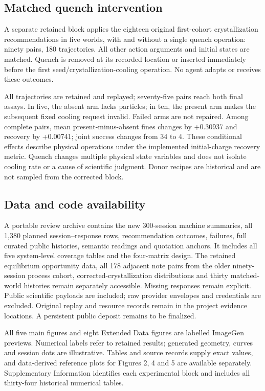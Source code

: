 \documentclass[12pt,a4paper]{article}
\begin{document}
\subsection{Matched quench intervention}\label{matched-quench-intervention}

A separate retained block applies the eighteen original first-cohort crystallization recommendations in five worlds, with and without a single quench operation: ninety pairs, 180 trajectories. All other action arguments and initial states are matched. Quench is removed at its recorded location or inserted immediately before the first seed/crystallization-cooling operation. No agent adapts or receives these outcomes.

All trajectories are retained and replayed; seventy-five pairs reach both final assays. In five, the absent arm lacks particles; in ten, the present arm makes the subsequent fixed cooling request invalid. Failed arms are not repaired. Among complete pairs, mean present-minus-absent fines changes by +0.30937 and recovery by +0.00741; joint success changes from 34 to 4. These conditional effects describe physical operations under the implemented initial-charge recovery metric. Quench changes multiple physical state variables and does not isolate cooling rate or a cause of scientific judgment. Donor recipes are historical and are not sampled from the corrected block.

\subsection{Data and code availability}\label{data-and-code-availability}

A portable review archive contains the new 300-session machine summaries, all 1,380 planned session--response rows, recommendation outcomes, failures, full curated public histories, semantic readings and quotation anchors. It includes all five system-level coverage tables and the four-matrix design. The retained equilibrium opportunity data, all 178 adjacent note pairs from the older ninety-session process cohort, corrected-crystallization distributions and thirty matched-world histories remain separately accessible. Missing responses remain explicit. Public scientific payloads are included; raw provider envelopes and credentials are excluded. Original replay and resource records remain in the project evidence locations. A persistent public deposit remains to be finalized.

All five main figures and eight Extended Data figures are labelled ImageGen previews. Numerical labels refer to retained results; generated geometry, curves and session dots are illustrative. Tables and source records supply exact values, and data-derived reference plots for Figures 2, 4 and 5 are available separately. Supplementary Information identifies each experimental block and includes all thirty-four historical numerical tables.
\end{document}
